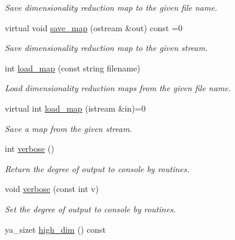 \begin{CompactItemize}
\begin{CompactList}\small\item\em Save dimensionality reduction map to the given file name. \item\end{CompactList}\item 
\hypertarget{class_y_a_dim_reduce_a13}{
virtual void \hyperlink{class_y_a_dim_reduce_a13}{save\_\-map} (ostream \&out) const =0}
\label{class_y_a_dim_reduce_a13}

\begin{CompactList}\small\item\em Save dimensionality reduction map to the given stream. \item\end{CompactList}\item 
int \hyperlink{class_y_a_dim_reduce_a14}{load\_\-map} (const string filename)
\begin{CompactList}\small\item\em Load dimensionality reduction maps from the given file name. \item\end{CompactList}\item 
\hypertarget{class_y_a_dim_reduce_a15}{
virtual int \hyperlink{class_y_a_dim_reduce_a15}{load\_\-map} (istream \&in)=0}
\label{class_y_a_dim_reduce_a15}

\begin{CompactList}\small\item\em Save a map from the given stream. \item\end{CompactList}\item 
int \hyperlink{class_y_a_dim_reduce_a16}{verbose} ()
\begin{CompactList}\small\item\em Return the degree of output to console by routines. \item\end{CompactList}\item 
void \hyperlink{class_y_a_dim_reduce_a17}{verbose} (const int v)
\begin{CompactList}\small\item\em Set the degree of output to console by routines. \item\end{CompactList}\item 
\hypertarget{class_y_a_dim_reduce_a18}{
ya\_\-sizet \hyperlink{class_y_a_dim_reduce_a18}{high\_\-dim} () const }
\label{class_y_a_dim_reduce_a18}


\end{CompactItemize}
